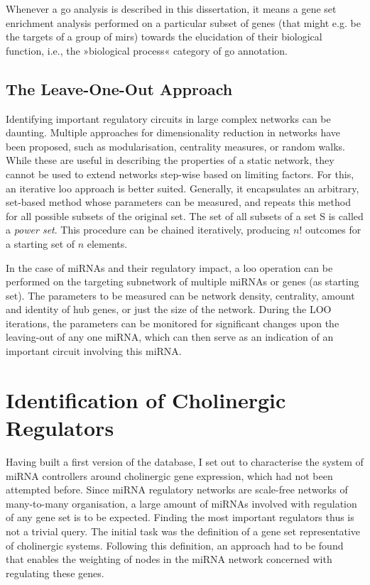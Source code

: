 \begin{method}
Whenever a \ac{go} analysis is described in this dissertation, it means a gene set enrichment analysis performed on a particular subset of genes (that might e.g. be the targets of a group of \acp{mir}) towards the elucidation of their biological function, i.e., the »biological process« category of \ac{go} annotation.

\subsection{The Leave-One-Out Approach}
Identifying important regulatory circuits in large complex networks can be daunting. Multiple approaches for dimensionality reduction in networks have been proposed, such as modularisation, centrality measures, or random walks. While these are useful in describing the properties of a static network, they cannot be used to extend networks step-wise based on limiting factors. For this, an iterative \ac{loo} approach is better suited. Generally, it encapsulates an arbitrary, set-based method whose parameters can be measured, and repeats this method for all possible subsets of the original set. The set of all subsets of a set S is called a \emph{power set}. This procedure can be chained iteratively, producing $n!$ outcomes for a starting set of $n$ elements.

In the case of miRNAs and their regulatory impact, a \ac{loo} operation can be performed on the targeting subnetwork of multiple miRNAs or genes (as starting set). The parameters to be measured can be network density, centrality, amount and identity of hub genes, or just the size of the network. During the LOO iterations, the parameters can be monitored for significant changes upon the leaving-out of any one miRNA, which can then serve as an indication of an important circuit involving this miRNA. 

\end{method}

\section{Identification of Cholinergic Regulators} \label{sec:database:chol-reg}
Having built a first version of the database, I set out to characterise the system of miRNA controllers around cholinergic gene expression, which had not been attempted before. Since miRNA regulatory networks are scale-free networks of many-to-many organisation, a large amount of miRNAs involved with regulation of any gene set is to be expected. Finding the most important regulators thus is not a trivial query. The initial task was the definition of a gene set representative of cholinergic systems. Following this definition, an approach had to be found that enables the weighting of nodes in the miRNA network concerned with regulating these genes.

